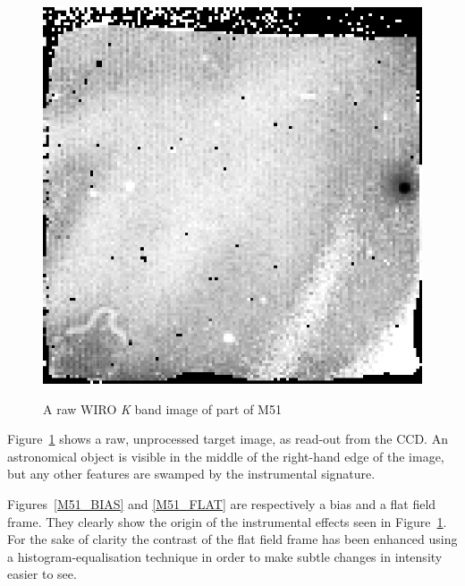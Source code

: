 \documentclass[twoside,11pt]{article}
\begin{document}
\begin{figure}[htbp]
   \centering 
   \includegraphics[totalheight=3.5in]{sc5_m51_raw.ps}
   \begin{quote}
   \caption{A raw WIRO {\it K}\/ band image of part of M51
   \label{M51_RAW} }
   \end{quote}
\end{figure}

Figure~\ref{M51_RAW} shows a raw, unprocessed target image, as read-out from
the CCD.  An astronomical object is visible in the middle of the right-hand
edge of the image, but any other features are swamped by the instrumental
signature.

Figures~\ref{M51_BIAS} and \ref{M51_FLAT} are respectively a bias and a
flat field frame.  They clearly show the origin of the instrumental effects
seen in Figure~\ref{M51_RAW}.  For the sake of clarity the contrast of the 
flat field frame has been enhanced using a histogram-equalisation
technique in order to make subtle changes in intensity easier to see.
\end{document}
